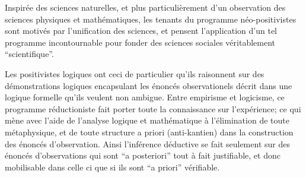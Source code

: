 Inspirée des sciences naturelles, et plus particulièrement d'un observation des sciences physiques et mathématiques,  les tenants du programme néo-positivistes sont motivés par l'unification des sciences, et pensent l'application d'un tel programme incontournable pour fonder des sciences sociales véritablement \enquote{scientifique}. \textcite[1-20]{Ouelbani2006}

Les positivistes logiques ont ceci de particulier qu'ils raisonnent sur des démonstrations logiques encapsulant les énoncés observationels décrit dans une logique formelle qu'ils veulent non ambigue. Entre empirisme et logicisme, ce programme réductioniste fait porter toute la connaissance sur l'expérience; ce qui mène avec l'aide de l'analyse logique et mathématique à l'élimination de toute métaphysique, et de toute structure a priori (anti-kantien) dans la construction des énoncés d'observation. Ainsi l'inférence déductive se fait seulement sur des énoncés d'observations qui sont \foreignquote{latin}{a posteriori} tout à fait justifiable, et donc mobilisable dans celle ci que si ils sont \foreignquote{latin}{a priori} vérifiable.

